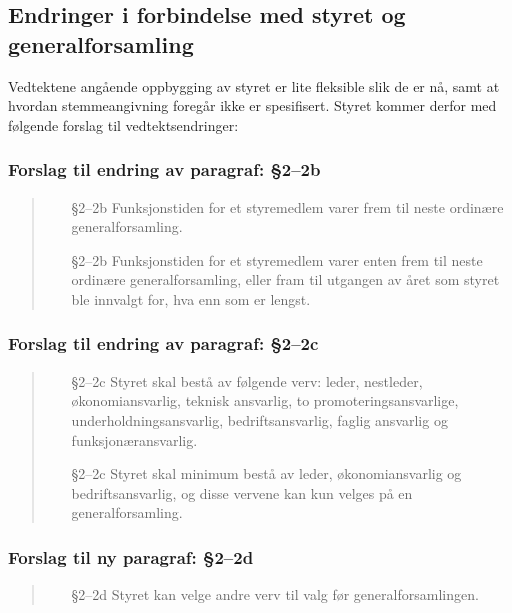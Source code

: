 \documentclass[10pt,norsk,a4paper]{article}
\begin{document}
\subsection{Endringer i forbindelse med styret og generalforsamling}
Vedtektene angående oppbygging av styret er lite fleksible slik de er nå, samt at hvordan stemmeangivning foregår ikke er spesifisert. Styret kommer derfor med følgende forslag til vedtektsendringer:

\subsubsection{Forslag til endring av paragraf: §2--2b}
\begin{quote}
	\begin{enumerate}
		\item[§2--2b] Funksjonstiden for et styremedlem varer frem til neste ordinære generalforsamling.
		\item[§2--2b] Funksjonstiden for et styremedlem varer enten frem til neste ordinære generalforsamling, eller fram til utgangen av året som styret ble innvalgt for, hva enn som er lengst.
	\end{enumerate}
\end{quote}

\subsubsection{Forslag til endring av paragraf: §2--2c}
\begin{quote}
	\begin{enumerate}
		\item[§2--2c] Styret skal bestå av følgende verv: leder, nestleder, økonomiansvarlig, teknisk ansvarlig, to promoteringsansvarlige, underholdningsansvarlig, bedriftsansvarlig, faglig ansvarlig og funksjonæransvarlig.
		\item[§2--2c] Styret skal minimum bestå av leder, økonomiansvarlig og bedriftsansvarlig, og disse vervene kan kun velges på en generalforsamling.
	\end{enumerate}
\end{quote}

\subsubsection{Forslag til ny paragraf: §2--2d}
\begin{quote}
	\begin{enumerate}
		\item[§2--2d] Styret kan velge andre verv til valg før generalforsamlingen.
	\end{enumerate}
\end{quote}
\end{document}
